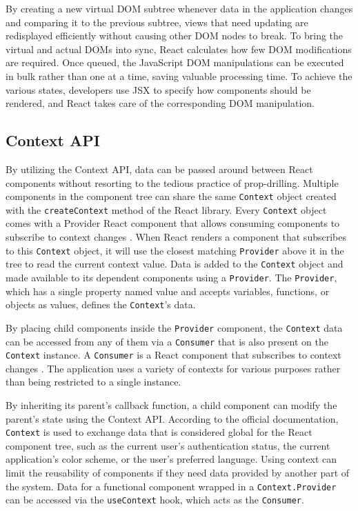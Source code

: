 By creating a new virtual DOM subtree whenever data in the application changes and comparing it to the previous subtree, views that need updating are redisplayed efficiently without causing other DOM nodes to break. To bring the virtual and actual DOMs into sync, React calculates how few DOM modifications are required. Once queued, the JavaScript DOM manipulations can be executed in bulk rather than one at a time, saving valuable processing time. To achieve the various states, developers use JSX to specify how components should be rendered, and React takes care of the corresponding DOM manipulation.

\subsection{Context API}
\label{contextApi}
By utilizing the Context API, data can be passed around between React components without resorting to the tedious practice of prop-drilling. Multiple components in the component tree can share the same \texttt{Context} object created with the \texttt{createContext} method of the React library. Every \texttt{Context} object comes with a Provider React component that allows consuming components to subscribe to context changes \autocite{react2021context}. When React renders a component that subscribes to this \texttt{Context} object, it will use the closest matching \texttt{Provider} above it in the tree to read the current context value. Data is added to the \texttt{Context} object and made available to its dependent components using a \texttt{Provider}. The \texttt{Provider}, which has a single property named value and accepts variables, functions, or objects as values, defines the \texttt{Context}'s data.

By placing child components inside the \texttt{Provider} component, the \texttt{Context} data can be accessed from any of them via a \texttt{Consumer} that is also present on the \texttt{Context} instance. A \texttt{Consumer} is a React component that subscribes to context changes \autocite{react2021context}. The application uses a variety of contexts for various purposes rather than being restricted to a single instance.

By inheriting its parent's callback function, a child component can modify the parent's state using the Context API. According to the official documentation, \texttt{Context} is used to exchange data that is considered global for the React component tree, such as the current user's authentication status, the current application's color scheme, or the user's preferred language. Using context can limit the reusability of components if they need data provided by another part of the system. Data for a functional component wrapped in a \texttt{Context.Provider} can be accessed via the \texttt{useContext} hook, which acts as the \texttt{Consumer}.


